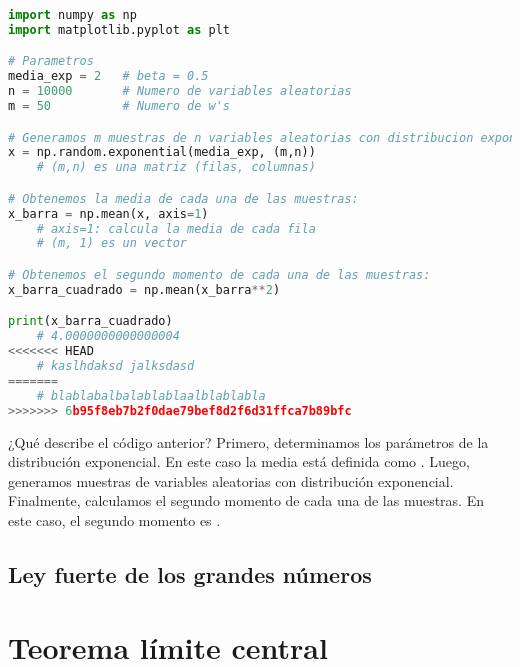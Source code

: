\documentclass[8pt]{article}
\newcommand{\code}[1]{\texttt{\color{frenchplum}{#1}}}
\begin{document}
\vspace*{0.3cm}

\begin{lstlisting}[language=Python]
import numpy as np
import matplotlib.pyplot as plt

# Parametros
media_exp = 2   # beta = 0.5
n = 10000       # Numero de variables aleatorias
m = 50          # Numero de w's

# Generamos m muestras de n variables aleatorias con distribucion exponencial:
x = np.random.exponential(media_exp, (m,n))
    # (m,n) es una matriz (filas, columnas)

# Obtenemos la media de cada una de las muestras:
x_barra = np.mean(x, axis=1)
    # axis=1: calcula la media de cada fila
    # (m, 1) es un vector

# Obtenemos el segundo momento de cada una de las muestras:
x_barra_cuadrado = np.mean(x_barra**2)

print(x_barra_cuadrado)
    # 4.0000000000000004
<<<<<<< HEAD
    # kaslhdaksd jalksdasd
=======
    # blablabalbalablablaalblablabla
>>>>>>> 6b95f8eb7b2f0dae79bef8d2f6d31ffca7b89bfc
\end{lstlisting}

\vspace*{0.3cm}

¿Qué describe el código anterior? Primero, determinamos los parámetros de la distribución exponencial. En este caso la media está definida como \code{media\_exp = 2}. Luego, generamos \code{m} muestras de \code{n} variables aleatorias con distribución exponencial. Finalmente, calculamos el segundo momento de cada una de las muestras. En este caso, el segundo momento es \code{4.0000000000000004}.





\subsection{Ley fuerte de los grandes números}




\section{Teorema límite central}
\end{document}
